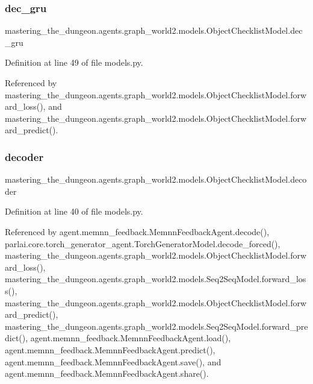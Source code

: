 \subsubsection{\texorpdfstring{dec\+\_\+gru}{dec\_gru}}
{\footnotesize\ttfamily mastering\+\_\+the\+\_\+dungeon.\+agents.\+graph\+\_\+world2.\+models.\+Object\+Checklist\+Model.\+dec\+\_\+gru}



Definition at line 49 of file models.\+py.



Referenced by mastering\+\_\+the\+\_\+dungeon.\+agents.\+graph\+\_\+world2.\+models.\+Object\+Checklist\+Model.\+forward\+\_\+loss(), and mastering\+\_\+the\+\_\+dungeon.\+agents.\+graph\+\_\+world2.\+models.\+Object\+Checklist\+Model.\+forward\+\_\+predict().

\mbox{\label{classmastering__the__dungeon_1_1agents_1_1graph__world2_1_1models_1_1ObjectChecklistModel_a8e5e4a8bc425c33000a62162b1228691}} 
\subsubsection{\texorpdfstring{decoder}{decoder}}
{\footnotesize\ttfamily mastering\+\_\+the\+\_\+dungeon.\+agents.\+graph\+\_\+world2.\+models.\+Object\+Checklist\+Model.\+decoder}



Definition at line 40 of file models.\+py.



Referenced by agent.\+memnn\+\_\+feedback.\+Memnn\+Feedback\+Agent.\+decode(), parlai.\+core.\+torch\+\_\+generator\+\_\+agent.\+Torch\+Generator\+Model.\+decode\+\_\+forced(), mastering\+\_\+the\+\_\+dungeon.\+agents.\+graph\+\_\+world2.\+models.\+Object\+Checklist\+Model.\+forward\+\_\+loss(), mastering\+\_\+the\+\_\+dungeon.\+agents.\+graph\+\_\+world2.\+models.\+Seq2\+Seq\+Model.\+forward\+\_\+loss(), mastering\+\_\+the\+\_\+dungeon.\+agents.\+graph\+\_\+world2.\+models.\+Object\+Checklist\+Model.\+forward\+\_\+predict(), mastering\+\_\+the\+\_\+dungeon.\+agents.\+graph\+\_\+world2.\+models.\+Seq2\+Seq\+Model.\+forward\+\_\+predict(), agent.\+memnn\+\_\+feedback.\+Memnn\+Feedback\+Agent.\+load(), agent.\+memnn\+\_\+feedback.\+Memnn\+Feedback\+Agent.\+predict(), agent.\+memnn\+\_\+feedback.\+Memnn\+Feedback\+Agent.\+save(), and agent.\+memnn\+\_\+feedback.\+Memnn\+Feedback\+Agent.\+share().

